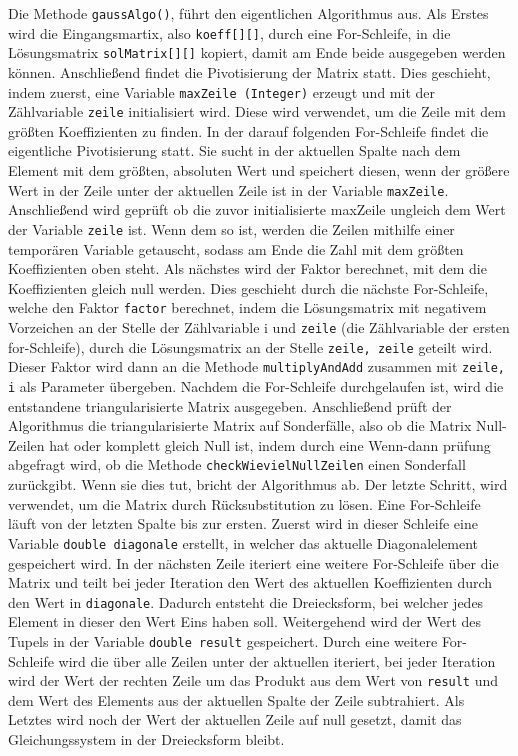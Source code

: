 \documentclass[a4paper, 12pt]{report}
\begin{document}
Die Methode \texttt{gaussAlgo()}, führt den eigentlichen Algorithmus aus.
Als Erstes wird die Eingangsmartix, also \texttt{koeff[][]}, durch eine For-Schleife, in die Lösungsmatrix \texttt{solMatrix[][]} kopiert, damit am Ende
beide ausgegeben werden können.
Anschließend findet die Pivotisierung der Matrix statt. Dies geschieht, indem zuerst,
eine Variable \texttt{maxZeile (Integer)} erzeugt und mit der Zählvariable \texttt{zeile} initialisiert wird.
Diese wird verwendet, um die Zeile mit dem größten Koeffizienten zu finden.
In der darauf folgenden For-Schleife findet die eigentliche Pivotisierung statt.
Sie sucht in der aktuellen Spalte nach dem Element mit dem größten, absoluten Wert
und speichert diesen, wenn der größere Wert in der Zeile unter der aktuellen Zeile ist in der Variable \texttt{maxZeile}.
Anschließend wird geprüft ob die zuvor initialisierte maxZeile ungleich dem Wert der Variable \texttt{zeile} ist.
Wenn dem so ist, werden die Zeilen mithilfe einer temporären Variable getauscht, sodass am Ende die
Zahl mit dem größten Koeffizienten oben steht.
Als nächstes wird der Faktor berechnet, mit dem die Koeffizienten gleich null werden.
Dies geschieht durch die nächste For-Schleife, welche den Faktor \texttt{factor} berechnet, indem die Lösungsmatrix mit negativem Vorzeichen an der Stelle der Zählvariable i
und \texttt{zeile} (die Zählvariable der ersten for-Schleife), durch die Lösungsmatrix an der Stelle \texttt{zeile, zeile} geteilt wird.
Dieser Faktor wird dann an die Methode \texttt{multiplyAndAdd} zusammen mit \texttt{zeile, i} als Parameter übergeben. Nachdem
die For-Schleife durchgelaufen ist, wird die entstandene triangularisierte Matrix  ausgegeben. \newline Anschließend prüft der Algorithmus
die triangularisierte Matrix auf Sonderfälle, also ob die Matrix Null-Zeilen hat oder komplett gleich Null ist, indem durch eine Wenn-dann prüfung
abgefragt wird, ob die Methode \texttt{checkWievielNullZeilen} einen Sonderfall zurückgibt. Wenn sie dies tut, bricht der Algorithmus ab. \newline
Der letzte Schritt, wird verwendet, um die Matrix durch Rücksubstitution zu lösen.
Eine For-Schleife läuft von der letzten Spalte bis zur ersten. Zuerst wird in dieser Schleife eine Variable \texttt{double diagonale}
erstellt, in welcher das aktuelle Diagonalelement gespeichert wird. In der nächsten Zeile iteriert eine weitere For-Schleife
über die Matrix und teilt bei jeder Iteration den Wert des aktuellen Koeffizienten durch den Wert in \texttt{diagonale}.
Dadurch entsteht die Dreiecksform, bei welcher jedes Element in dieser den Wert Eins haben soll.
Weitergehend wird der Wert des Tupels in der Variable \texttt{double result} gespeichert.
Durch eine weitere For-Schleife wird die über alle Zeilen unter der aktuellen iteriert, bei jeder Iteration wird der Wert
der rechten Zeile um das Produkt aus dem Wert von \texttt{result} und dem Wert des Elements aus der aktuellen Spalte der Zeile
subtrahiert. Als Letztes wird noch der Wert der aktuellen Zeile auf null gesetzt, damit das Gleichungssystem in der Dreiecksform
bleibt.
\end{document}
